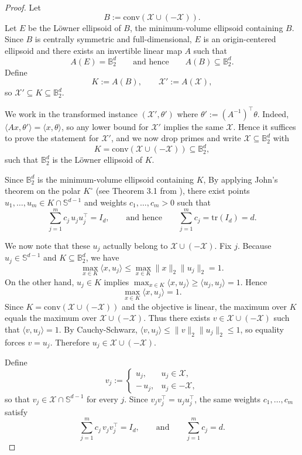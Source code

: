 \begin{proof}
Let
\[
B := \mathrm{conv}(\mathcal{X}\cup(-\mathcal{X})).
\]
Let $E$ be the L\"owner ellipsoid of $B$, the minimum-volume ellipsoid containing $B$.
Since $B$ is centrally symmetric and full-dimensional, $E$ is an origin-centered ellipsoid and there exists an invertible linear map $A$ such that
\[
A(E)=\mathbb{B}_2^d
\qquad\text{and hence}\qquad
A(B)\subseteq \mathbb{B}_2^d.
\]
Define
\[
K := A(B),\qquad \mathcal{X}' := A(\mathcal{X}),
\]
so $\mathcal{X}'\subseteq K\subseteq \mathbb{B}_2^d$.

We work in the transformed instance $(\mathcal{X}',\theta')$ where $\theta' := (A^{-1})^\top \theta$.
Indeed, $\langle Ax,\theta'\rangle=\langle x,\theta\rangle$, so any lower bound for $\mathcal{X}'$ implies the same $\mathcal{X}$.
Hence it suffices to prove the statement for $\mathcal{X}'$, and we now drop primes and write $\mathcal{X}\subseteq \mathbb{B}_2^d$ with
\[
K = \mathrm{conv}(\mathcal{X}\cup(-\mathcal{X}))\subseteq \mathbb{B}_2^d,
\]
such that $\mathbb{B}_2^d$ is the L\"owner ellipsoid of $K$.

Since $\mathbb{B}_2^d$ is the minimum-volume ellipsoid containing $K$,
By applying John’s theorem on the polar $K^\circ$ (see Theorem 3.1 from \cite{ball1997elementary}), there exist points $u_1,\dots,u_m \in K\cap \mathbb{S}^{d-1}$ and weights $c_1,\dots,c_m>0$ such that
\begin{equation}\label{eq:john}
\sum_{j=1}^m c_j\, u_j u_j^\top = I_d,
\qquad\text{and hence}\qquad
\sum_{j=1}^m c_j = \mathrm{tr}(I_d)=d.
\end{equation}

We now note that these $u_j$ actually belong to $\mathcal{X}\cup(-\mathcal{X})$.
Fix $j$.
Because $u_j\in \mathbb{S}^{d-1}$ and $K\subseteq \mathbb{B}_2^d$, we have
\[
\max_{x\in K}\langle x,u_j\rangle \le \max_{x\in K}\|x\|_2\|u_j\|_2= 1.
\]
On the other hand, $u_j\in K$ implies $\max_{x\in K}\langle x,u_j\rangle \ge \langle u_j,u_j\rangle =1$.
Hence
\[
\max_{x\in K}\langle x,u_j\rangle = 1.
\]
Since $K=\mathrm{conv}(\mathcal{X}\cup(-\mathcal{X}))$ and the objective is linear, the maximum over $K$ equals the maximum over $\mathcal{X}\cup(-\mathcal{X})$.
Thus there exists $v\in \mathcal{X}\cup(-\mathcal{X})$ such that $\langle v,u_j\rangle=1$.
By Cauchy-Schwarz, $\langle v,u_j\rangle \le \|v\|_2\|u_j\|_2 \le 1$, so equality forces $v=u_j$.
Therefore $u_j\in \mathcal{X}\cup(-\mathcal{X})$.

Define
\[
v_j :=
\begin{cases}
u_j, & u_j\in \mathcal{X},\\
-\,u_j, & u_j\in -\mathcal{X},
\end{cases}
\]
so that $v_j\in \mathcal{X}\cap \mathbb{S}^{d-1}$ for every $j$.
Since $v_j v_j^\top = u_j u_j^\top$, the same weights $c_1,\ldots,c_m$ satisfy
\begin{equation}\label{eq:johnX}
\sum_{j=1}^m c_j\, v_j v_j^\top = I_d,
\qquad\text{and}\qquad
\sum_{j=1}^m c_j = d.
\end{equation}


\end{proof}
